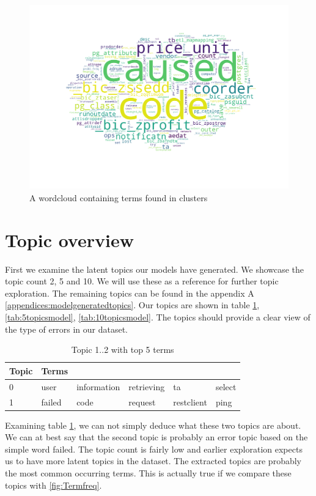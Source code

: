  \begin{figure}[h]
    \centering
    \includegraphics[width=15cm, height=8cm]{figures/wc.png}
    \caption{A wordcloud containing terms found in clusters}
    \label{fig:worldcloud}
\end{figure}

\FloatBarrier

\section{Topic overview}\label{results:topics}
First we examine the latent topics our models have generated. We showcase the topic count 2, 5 and 10. We will use these as a reference for further topic exploration. The remaining topics can be found in the appendix A \ref{appendices:modelgeneratedtopics}. Our topics are shown in table \ref{tab:2topicsmodel}, \ref{tab:5topicsmodel}, \ref{tab:10topicsmodel}. The topics should provide a clear view of the type of errors in our dataset.

\begin{table}[h]
\centering
\begin{tabular}{|l|l|l|l|l|l|}
 \hline
 Topic & Terms & & & & \\
 \hline
 \hline
 0 & user & information & retrieving & ta & select\\ 
 \hline 
 1 & failed & code & request & restclient & ping\\ 
 \hline 
\end{tabular}
\caption{Topic 1..2 with top 5 terms}
\label{tab:2topicsmodel}
\end{table}

Examining table \ref{tab:2topicsmodel}, we can not simply deduce what these two topics are about. We can at best say that the second topic is probably an error topic based on the simple word failed. The topic count is fairly low and earlier exploration expects us to have more latent topics in the dataset. The extracted topics are probably the most common occurring terms. This is actually true if we compare these topics with \ref{fig:Termfreq}.



